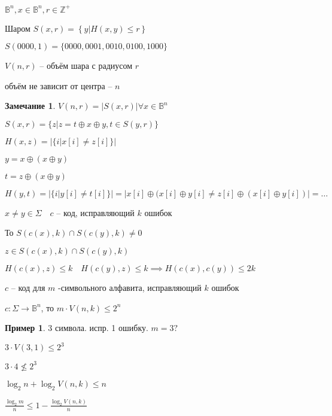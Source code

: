 \documentclass{book}
\newcommand\Z{\ensuremath{\mathbb{Z}}}
\theoremstyle{definition}
\newtheorem*{note}{Замечание}
\newtheorem*{example}{Пример}
\begin{document}
\begin{definition}
    $\mathbb{B}^n, x\in \mathbb{B}^n, r\in \Z ^+$

    Шаром $S(x,r) = \left\{ y| H(x,y)\leqslant r \right\} $

    $S(0000,1) = \{0000,0001,0010,0100,1000\}$
\end{definition}

\begin{definition}
    $V(n,r)$ -- объём шара с радиусом $r$

    объём не зависит от центра --  $n$
\end{definition}
\begin{note}
    $V(n,r) = |S(x,r)| \forall x\in \mathbb{B}^n$

    $S(x,r) = \{z|z=t\oplus x\oplus y, t\in S(y,r)\}$

    $H(x,z) = |\{i|x[i]\neq z[i]\}|$

    $y = x\oplus (x\oplus y)$

    $t = z\oplus(x\oplus y)$

    $H(y,t) = \left| \{i|y[i]\neq t[i]\} \right| = \left| x[i] \oplus(x[i]\oplus y[i]\neq z[i]\oplus (x[i]\oplus y[i]) \right|   = \ldots$
\end{note}

\begin{lemma}
    $x\neq y\in \Sigma\quad c$ -- код, исправляющий $k$ ошибок

    То  $S(c(x), k) \cap S(c(y), k)\neq 0$

    $z\in S\left( c(x), k \right) \cap S\left( c(y), k \right) $

    $H(c(x), z)\leqslant k\quad H(c(y), z)\leqslant k \implies H(c(x), c(y))\leqslant 2k$
\end{lemma}

\begin{theorem}

    $c$ -- код для  $m$ -символьного алфавита, исправляющий  $k$ ошибок

    $c:\Sigma \to \mathbb{B}^n$, то $m\cdot V(n, k)\leqslant 2^n$
\end{theorem}
\begin{example}
    3 символа. испр. 1 ошибку. $m=3?$

    $3\cdot V(3,1)\leqslant 2^3$

    $3\cdot 4\not\leqslant  2^3$
\end{example}
    $\log _2n + \log _2V(n, k)\leqslant n$

    $\frac{\log _2m}{n}\leqslant 1 - \frac{\log _2V(n, k)}{n}$ 
\end{document}
